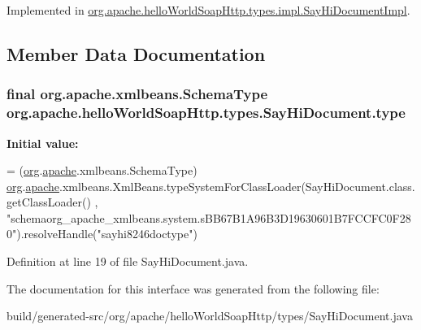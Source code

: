Implemented in \hyperlink{classorg_1_1apache_1_1hello_world_soap_http_1_1types_1_1impl_1_1_say_hi_document_impl_a4e9cf1753bdd4af6a13e55faa1446c41}{org.\+apache.\+hello\+World\+Soap\+Http.\+types.\+impl.\+Say\+Hi\+Document\+Impl}.



\subsection{Member Data Documentation}
\hypertarget{interfaceorg_1_1apache_1_1hello_world_soap_http_1_1types_1_1_say_hi_document_a88743ea190a45dc43d5e2240e4617426}{}
\subsubsection[{type}]{\setlength{\rightskip}{0pt plus 5cm}final org.\+apache.\+xmlbeans.\+Schema\+Type org.\+apache.\+hello\+World\+Soap\+Http.\+types.\+Say\+Hi\+Document.\+type\hspace{0.3cm}{\ttfamily [static]}}\label{interfaceorg_1_1apache_1_1hello_world_soap_http_1_1types_1_1_say_hi_document_a88743ea190a45dc43d5e2240e4617426}
{\bfseries Initial value\+:}
\begin{DoxyCode}
= (\hyperlink{namespaceorg}{org}.\hyperlink{namespaceorg_1_1apache}{apache}.xmlbeans.SchemaType)
        \hyperlink{namespaceorg}{org}.\hyperlink{namespaceorg_1_1apache}{apache}.xmlbeans.XmlBeans.typeSystemForClassLoader(SayHiDocument.class.getClassLoader()
      , \textcolor{stringliteral}{"schemaorg\_apache\_xmlbeans.system.sBB67B1A96B3D19630601B7FCCFC0F280"}).resolveHandle(\textcolor{stringliteral}{"sayhi8246doctype"})
\end{DoxyCode}


Definition at line 19 of file Say\+Hi\+Document.\+java.



The documentation for this interface was generated from the following file\+:\begin{DoxyCompactItemize}
\item 
build/generated-\/src/org/apache/hello\+World\+Soap\+Http/types/Say\+Hi\+Document.\+java\end{DoxyCompactItemize}

